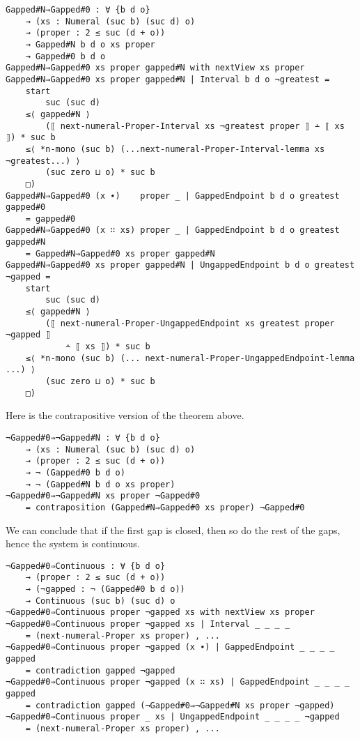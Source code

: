 \documentclass[\main/thesis.tex]{subfiles}
\begin{document}
\begin{lstlisting}[basicstyle=\ttfamily\scriptsize]
Gapped#N⇒Gapped#0 : ∀ {b d o}
    → (xs : Numeral (suc b) (suc d) o)
    → (proper : 2 ≤ suc (d + o))
    → Gapped#N b d o xs proper
    → Gapped#0 b d o
Gapped#N⇒Gapped#0 xs proper gapped#N with nextView xs proper
Gapped#N⇒Gapped#0 xs proper gapped#N | Interval b d o ¬greatest =
    start
        suc (suc d)
    ≤⟨ gapped#N ⟩
        (⟦ next-numeral-Proper-Interval xs ¬greatest proper ⟧ ∸ ⟦ xs ⟧) * suc b
    ≤⟨ *n-mono (suc b) (...next-numeral-Proper-Interval-lemma xs ¬greatest...) ⟩
        (suc zero ⊔ o) * suc b
    □)
Gapped#N⇒Gapped#0 (x ∙)    proper _ | GappedEndpoint b d o greatest gapped#0
    = gapped#0
Gapped#N⇒Gapped#0 (x ∷ xs) proper _ | GappedEndpoint b d o greatest gapped#N
    = Gapped#N⇒Gapped#0 xs proper gapped#N
Gapped#N⇒Gapped#0 xs proper gapped#N | UngappedEndpoint b d o greatest ¬gapped =
    start
        suc (suc d)
    ≤⟨ gapped#N ⟩
        (⟦ next-numeral-Proper-UngappedEndpoint xs greatest proper ¬gapped ⟧
            ∸ ⟦ xs ⟧) * suc b
    ≤⟨ *n-mono (suc b) (... next-numeral-Proper-UngappedEndpoint-lemma ...) ⟩
        (suc zero ⊔ o) * suc b
    □)
\end{lstlisting}

Here is the contrapositive version of the theorem above.

\begin{lstlisting}
¬Gapped#0⇒¬Gapped#N : ∀ {b d o}
    → (xs : Numeral (suc b) (suc d) o)
    → (proper : 2 ≤ suc (d + o))
    → ¬ (Gapped#0 b d o)
    → ¬ (Gapped#N b d o xs proper)
¬Gapped#0⇒¬Gapped#N xs proper ¬Gapped#0
    = contraposition (Gapped#N⇒Gapped#0 xs proper) ¬Gapped#0
\end{lstlisting}

We can conclude that if the first gap is closed,
then so do the rest of the gaps,
hence the system is continuous.

\begin{lstlisting}[basicstyle=\ttfamily\scriptsize]
¬Gapped#0⇒Continuous : ∀ {b d o}
    → (proper : 2 ≤ suc (d + o))
    → (¬gapped : ¬ (Gapped#0 b d o))
    → Continuous (suc b) (suc d) o
¬Gapped#0⇒Continuous proper ¬gapped xs with nextView xs proper
¬Gapped#0⇒Continuous proper ¬gapped xs | Interval _ _ _ _
    = (next-numeral-Proper xs proper) , ...
¬Gapped#0⇒Continuous proper ¬gapped (x ∙) | GappedEndpoint _ _ _ _ gapped
    = contradiction gapped ¬gapped
¬Gapped#0⇒Continuous proper ¬gapped (x ∷ xs) | GappedEndpoint _ _ _ _ gapped
    = contradiction gapped (¬Gapped#0⇒¬Gapped#N xs proper ¬gapped)
¬Gapped#0⇒Continuous proper _ xs | UngappedEndpoint _ _ _ _ ¬gapped
    = (next-numeral-Proper xs proper) , ...
\end{lstlisting}
\end{document}
